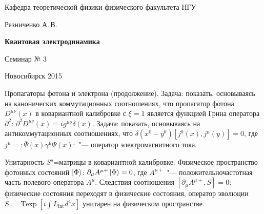 \documentclass[12pt,pagesize,paper=192mm:108mm]{scrbook}
\DeclareMathOperator{\Texp}{Texp}
\begin{document}
\begin{titlepage}
\begin{center}
    Кафедра теоретической физики физического факультета НГУ
    \medskip

    \Large
    Резниченко А.\,В.
    \bigskip

    \huge
    \textbf{Квантовая электродинамика}
    \bigskip

    \Large
    Семинар № 3
    \vfill

    \normalsize
    \vfill

    \normalsize \ccbysa\hspace{0.5em}  Новосибирск 2015
  \end{center}
\end{titlepage}
\newpage

\vspace*{-1em}
\begin{center}
\vfill
  \begin{minipage}{0.7\linewidth}

    Пропагаторы фотона и электрона (продолжение).  Задача: показать,
    основываясь на канонических коммутационных соотношениях, что
    пропагатор фотона $D^{\mu\nu}(x)$ в ковариантной калибровке с
    $\xi=1$ является функцией Грина оператора $\partial^2$:
    $\partial^2 D^{\mu\nu}(x)=i g^{\mu\nu}\delta(x)$.  Задача:
    показать, основываясь на антикоммутационных соотношениях, что
    $\delta(x^0-y^0)[j^0(x),j^{\mu}(y)]=0$, где
    $j^{\mu}={:}\bar{\Psi}(x) \gamma^{\mu} \Psi(x){:}$ "--- оператор
    электромагнитного тока.
    \smallskip

    Унитарность $S$"=матрицы в ковариантной калибровке.  Физическое
    пространство фотонных состояний $\ket{\Phi}$:
    $\partial_{\mu}A^{\mu+}\ket{\Phi}=0$, где $A^{\mu+}$ "---
    положительночастотная часть полевого оператора
    $A^{\mu}$. Следствия соотношения $[\partial_{\mu}A^{\mu+}, S]=0$:
    физические состояния переходят в физические состояния, оператор
    эволюции $S=\Texp[i \int L_{\text{int}} d^4 x]$ унитарен на
    физическом пространстве.
  \end{minipage}
  \vfill

\end{center}
\end{document}
